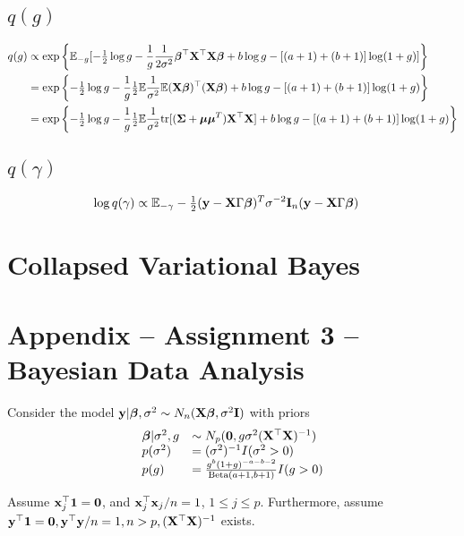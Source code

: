 \documentclass{amsart}[12pt]
\begin{document}
\subsection{$q(g)$}
\begin{align*}
q(g) &\propto \exp \left\{ \mathbb{E}_{-g} [-\tfrac{1}{2} \log g - \frac{1}{g} \frac{1}{2 \sigma^2} {\boldsymbol \beta}^\top {\bf X}^\top {\bf X} {\boldsymbol\beta} + b \log g - [(a + 1) + (b + 1)] \log(1 + g)] \right\} \\
&= \exp \left\{ -\tfrac{1}{2} \log g - \frac{1}{g} \tfrac{1}{2} \mathbb{E} \frac{1}{\sigma^2} \mathbb{E} ({\bf X} {\boldsymbol \beta})^\top ({\bf X} {\boldsymbol \beta}) + b \log g - [(a + 1) + (b + 1)] \log(1 + g) \right\} \\
&= \exp \left\{ -\tfrac{1}{2} \log g - \frac{1}{g} \tfrac{1}{2} \mathbb{E} \frac{1}{\sigma^2} \text{tr}[({\boldsymbol \Sigma} + {\boldsymbol \mu} {\boldsymbol \mu}^T) {\bf X}^\top {\bf X}] + b \log g - [(a + 1) + (b + 1)] \log(1 + g) \right\} \\
\end{align*}

\subsection{$q(\gamma)$}
\begin{align*}
\log q(\gamma) &\propto \mathbb{E}_{-\gamma} -\tfrac{1}{2} ({\bf y} - {\bf X} \Gamma {\boldsymbol\beta})^T \sigma^{-2} {\bf I}_n ({\bf y} - {\bf X} \Gamma {\boldsymbol\beta})
\end{align*}

\section{Collapsed Variational Bayes}

\section{Appendix -- Assignment 3 -- Bayesian Data Analysis}

Consider the model ${\bf y} | {\boldsymbol \beta}, \sigma^2 \sim N_n({\bf X} {\boldsymbol \beta}, \sigma^2 {\bf I})$ with priors
\begin{equation*}
\begin{array}{ll}
{\boldsymbol\beta} | \sigma^2, g &\sim N_p({\bf 0}, g \sigma^2({\bf X}^\top {\bf X})^{-1}) \\
p(\sigma^2) &= (\sigma^2)^{-1} I(\sigma^2 > 0) \\
p(g) &= \frac{g^b (1 + g)^{-a - b - 2}}{\text{Beta}(a + 1, b + 1)} I(g > 0)
\end{array}
\end{equation*}

Assume ${\bf x}_j^\top{\bf1} = {\bf 0}$, and ${\bf x}_j^\top {\bf x}_j / n = 1$, $1 \leq j \leq p$.
Furthermore, assume ${\bf y}^\top {\bf1} = {\bf 0}, {\bf y}^\top {\bf y} / n  = 1, n > p, ({\bf X}^\top {\bf X})^{-1}$ exists.
\end{document}
